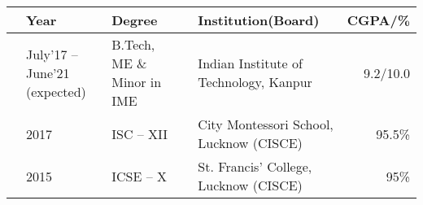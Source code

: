 
\newcommand{\education}[4]{
  & #1 & #2 & &#3 & #4
}
\begin{center}
\begin{tabular}{ | L{0.05cm} l | L{3cm} | L{0.05cm} C{7cm} | r |}
  \hline
  \education{\textbf{Year}}{\textbf{Degree}}{\textbf{Institution(Board)}}{\textbf{CGPA/\%}}\\
  \hline
  \education{July'17 -- June'21 (expected)}{B.Tech, ME \& Minor in IME}{Indian Institute of Technology, Kanpur}{9.2/10.0}\\
  \education{2017}{ISC -- XII}{City Montessori School, Lucknow (CISCE)}{95.5\%}\\
  \education{2015}{ICSE -- X}{St. Francis' College, Lucknow (CISCE)}{95\%}\\
  \hline
\end{tabular}
\end{center}
\vspace{-4mm}

